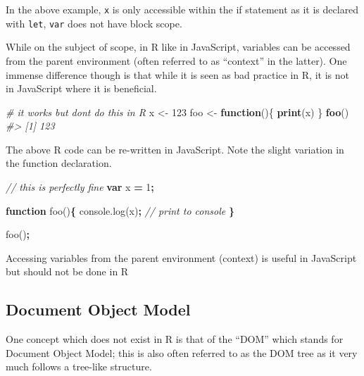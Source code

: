 \documentclass[
  10pt,
]{krantz}
\makeatletter
\newenvironment{Shaded}{\begin{snugshade}}{\end{snugshade}}
\newcommand{\AttributeTok}[1]{\textcolor[rgb]{0.61,0.61,0.61}{#1}}
\newcommand{\CommentTok}[1]{\textcolor[rgb]{0.37,0.37,0.37}{\textit{#1}}}
\newcommand{\ControlFlowTok}[1]{\textcolor[rgb]{0.27,0.27,0.27}{\textbf{#1}}}
\newcommand{\DecValTok}[1]{\textcolor[rgb]{0.06,0.06,0.06}{#1}}
\newcommand{\KeywordTok}[1]{\textcolor[rgb]{0.27,0.27,0.27}{\textbf{#1}}}
\newcommand{\NormalTok}[1]{#1}
\newcommand{\OperatorTok}[1]{\textcolor[rgb]{0.43,0.43,0.43}{\textbf{#1}}}
\newcommand{\StringTok}[1]{\textcolor[rgb]{0.5,0.5,0.5}{#1}}
\newcommand{\VariableTok}[1]{\textcolor[rgb]{0,0,0}{#1}}
\newenvironment{kframe}{%
\medskip{}
\setlength{\fboxsep}{.8em}
 \def\at@end@of@kframe{}%
 \ifinner\ifhmode%
  \def\at@end@of@kframe{\end{minipage}}%
  \begin{minipage}{\columnwidth}%
 \fi\fi%
 \def\FrameCommand##1{\hskip\@totalleftmargin \hskip-\fboxsep
 \colorbox{shadecolor}{##1}\hskip-\fboxsep
     \hskip-\linewidth \hskip-\@totalleftmargin \hskip\columnwidth}%
 \MakeFramed {\advance\hsize-\width
   \@totalleftmargin\z@ \linewidth\hsize
   \@setminipage}}%
 {\par\unskip\endMakeFramed%
 \at@end@of@kframe}
\renewenvironment{Shaded}{\begin{kframe}}{\end{kframe}}
\newenvironment{rmdblock}[1]
  {
  \begin{itemize}
  \renewcommand{\labelitemi}{
    \raisebox{-.7\height}[0pt][0pt]{
      {\setkeys{Gin}{width=3em,keepaspectratio}\texttt{[image: images/\#1]}}
    }
  }
  \setlength{\fboxsep}{1em}
  \begin{kframe}
  \item
  }
  {
  \end{kframe}
  \end{itemize}
  }
\newenvironment{rmdnote}
  {\begin{rmdblock}{note}}
  {\end{rmdblock}}
\makeatother
\begin{document}
In the above example, \texttt{x} is only accessible within the if statement as it is declared with \texttt{let}, \texttt{var} does not have block scope.

While on the subject of scope, in R like in JavaScript, variables can be accessed from the parent environment (often referred to as ``context'' in the latter). One immense difference though is that while it is seen as bad practice in R, it is not in JavaScript where it is beneficial.

\begin{Shaded}
\begin{Highlighting}[]
\CommentTok{\# it works but don\textquotesingle{}t do this in R}
\NormalTok{x <{-}}\StringTok{ }\DecValTok{123}
\NormalTok{foo <{-}}\StringTok{ }\ControlFlowTok{function}\NormalTok{()\{}
  \KeywordTok{print}\NormalTok{(x)}
\NormalTok{\}}
\KeywordTok{foo}\NormalTok{()}
\CommentTok{\#> [1] 123}
\end{Highlighting}
\end{Shaded}

The above R code can be re-written in JavaScript. Note the slight variation in the function declaration.

\begin{Shaded}
\begin{Highlighting}[]
\CommentTok{// this is perfectly fine}
\KeywordTok{var}\NormalTok{ x }\OperatorTok{=} \DecValTok{1}\OperatorTok{;}

\KeywordTok{function} \AttributeTok{foo}\NormalTok{()}\OperatorTok{\{}
  \VariableTok{console}\NormalTok{.}\AttributeTok{log}\NormalTok{(x)}\OperatorTok{;} \CommentTok{// print to console}
\OperatorTok{\}}

\AttributeTok{foo}\NormalTok{()}\OperatorTok{;}
\end{Highlighting}
\end{Shaded}

\begin{rmdnote}
Accessing variables from the parent environment (context) is useful in
JavaScript but should not be done in R
\end{rmdnote}

\hypertarget{basics-object-model}{%
\subsection{Document Object Model}\label{basics-object-model}}

One concept which does not exist in R is that of the ``DOM'' which stands for Document Object Model; this is also often referred to as the DOM tree as it very much follows a tree-like structure.
\end{document}
